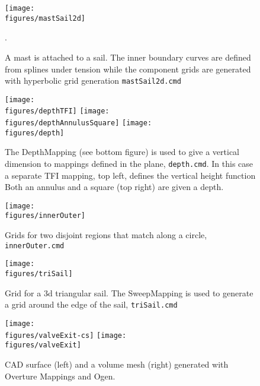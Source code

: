\documentclass[xcolor=rgb,svgnames,dvipsnames]{article}
\newcommand{\figures}{../fig}
\begin{document}
\begin{figure}[hbt]
  \begin{center}
   \texttt{[image: \\figures/mastSail2d]}
  \caption{A mast is attached to a sail. The inner boundary curves are defined from splines under tension
    while the component grids are generated with hyperbolic grid generation {\tt mastSail2d.cmd}}. 
  \end{center}
\end{figure}

\begin{figure}[hbt]
  \begin{center}
   \texttt{[image: \\figures/depthTFI]}
   \texttt{[image: \\figures/depthAnnulusSquare]}
   \texttt{[image: \\figures/depth]}
  \caption{The DepthMapping (see bottom figure) 
           is used to give a vertical dimension to mappings defined in the plane, {\tt depth.cmd}.
           In this case a separate TFI mapping, top left, defines the vertical height function
           Both an annulus and a square (top right) are given a depth.}
  \end{center}
\end{figure}

\begin{figure}[hbt]
\begin{center}
   \texttt{[image: \\figures/innerOuter]}
  \caption{Grids for two disjoint regions that match along a circle, {\tt innerOuter.cmd}}\label{fig:innerOuter}
\end{center}
\end{figure}


\begin{figure}[hbt]
  \begin{center}
   \texttt{[image: \\figures/triSail]}
  \caption{Grid for a 3d triangular sail. The SweepMapping is used to generate a grid around
    the edge of the sail, {\tt triSail.cmd}}
  \end{center}
\end{figure}

\begin{figure}[hbt]
\begin{center}
   \texttt{[image: \\figures/valveExit-cs]}
   \texttt{[image: \\figures/valveExit]}
  \caption{CAD surface (left) and a volume mesh (right) generated with Overture Mappings and Ogen. }
\end{center}
\end{figure}
\end{document}
